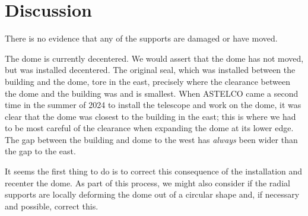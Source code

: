 \documentclass{article}
\begin{document}
\section{Discussion}

There is no evidence that any of the supports are damaged or have moved.

The dome is currently decentered. We would assert that the dome has not moved, but was installed decentered. The original seal, which was installed between the building and the dome, tore in the east, precisely where the clearance between the dome and the building was and is smallest. When ASTELCO came a second time in the summer of 2024 to install the telescope and work on the dome, it was clear that the dome was closest to the building in the east; this is where we had to be most careful of the clearance when expanding the dome at its lower edge. The gap between the building and dome to the west has \emph{always} been wider than the gap to the east.

It seems the first thing to do is to correct this consequence of the installation and recenter the dome. As part of this process, we might also consider if the radial supports are locally deforming the dome out of a circular shape and, if necessary and possible, correct this.
\end{document}
